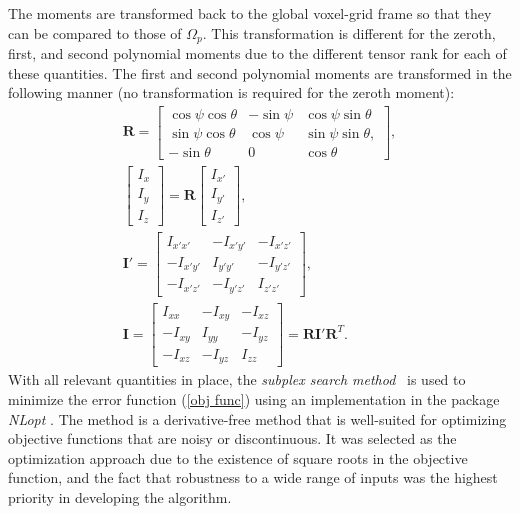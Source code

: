 The moments are transformed back to the global voxel-grid frame so that they can be compared to those of $\Omega_p$. This transformation is different for the zeroth, first, and second polynomial moments due to the different tensor rank for each of these quantities. The first and second polynomial moments are transformed in the following manner (no transformation is required for the zeroth moment):
\begin{gather}
\bm{R} = \left[\begin{array} {ccc} {\cos\psi\cos\theta} & {-\sin\psi} & {\cos\psi\sin\theta}\\ {\sin\psi\cos\theta} & {\cos\psi} & {\sin\psi\sin\theta}, \\
{-\sin\theta} & {0} & {\cos\theta}\end{array} \right], \\
\left[\begin{array} {ccc} {I_x} \\ {I_y} \\ {I_z} \end{array} \right] = \bm{R} \left[\begin{array} {ccc} {I_{x'}} \\ {I_{y'}} \\ {I_{z'}} \end{array} \right], \\
\bm{I}' = \left[\begin{array} {ccc} {I_{x'x'}} & {-I_{x'y'}} & {-I_{x'z'}}\\ {-I_{x'y'}} & {I_{y'y'}} & {-I_{y'z'}} \\ -{I_{x'z'}} & {-I_{y'z'}} & {I_{z'z'}} \end{array} \right], \\
\bm{I} = \left[\begin{array} {ccc} {I_{xx}} & {-I_{xy}} & {-I_{xz}}\\ {-I_{xy}} & {I_{yy}} & {-I_{yz}} \\ -{I_{xz}} & {-I_{yz}} & {I_{zz}} \end{array} \right] = \bm{R}\bm{I}'\mathbf{R}^T.
\end{gather}
\noindent With all relevant quantities in place, the \textit{subplex search method}~\cite{rowan} is used to minimize the error function (\ref{obj func}) using an implementation in the package \textit{NLopt} \cite{nlo}. The method is a derivative-free method that is well-suited for optimizing objective functions that are noisy or discontinuous. It was selected as the optimization approach due to the existence of square roots in the objective function, and the fact that robustness to a wide range of inputs was the highest priority in developing the algorithm.

